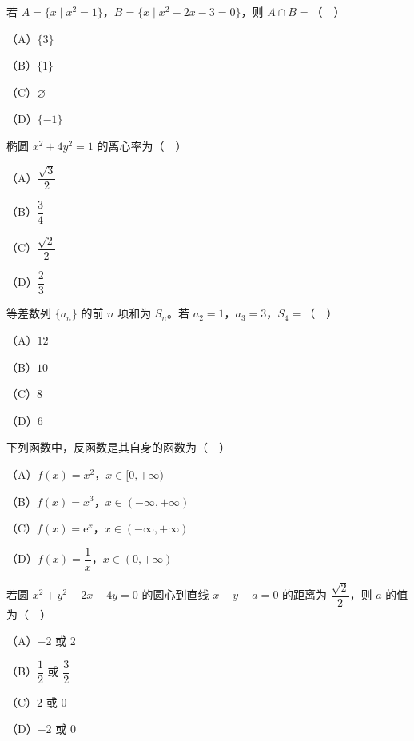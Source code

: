 


\begin{question}
若 $A=\{x\mid x^2=1\}$，$B=\{x\mid x^2-2x-3=0\}$，则 $A\cap B=$（　）

（A）$\{3\}$

（B）$\{1\}$

（C）$\varnothing$

（D）$\{-1\}$

\end{question}
\begin{question}
椭圆 $x^2+4y^2=1$ 的离心率为（　）

（A）$\dfrac{\sqrt3}{2}$

（B）$\dfrac34$

（C）$\dfrac{\sqrt2}{2}$

（D）$\dfrac23$

\end{question}
\begin{question}
等差数列 $\{a_n\}$ 的前 $n$ 项和为 $S_n$。若 $a_2=1$，$a_3=3$，$S_4=$（　）

（A）$12$

（B）$10$

（C）$8$

（D）$6$

\end{question}
\begin{question}
下列函数中，反函数是其自身的函数为（　）

（A）$f(x)=x^2$，$x\in[0,+\infty)$

（B）$f(x)=x^3$，$x\in(-\infty,+\infty)$

（C）$f(x)=\mathrm e^x$，$x\in(-\infty,+\infty)$

（D）$f(x)=\dfrac1x$，$x\in(0,+\infty)$

\end{question}
\begin{question}
若圆 $x^2+y^2-2x-4y=0$ 的圆心到直线 $x-y+a=0$ 的距离为 $\dfrac{\sqrt2}{2}$，则 $a$ 的值为（　）

（A）$-2$ 或 $2$

（B）$\dfrac12$ 或 $\dfrac32$

（C）$2$ 或 $0$

（D）$-2$ 或 $0$

\end{question}
